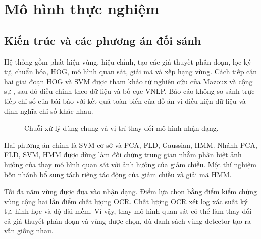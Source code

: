 \chapter{Mô hình thực nghiệm}
\section{Kiến trúc và các phương án đối sánh}
Hệ thống gồm phát hiện vùng, hiệu chỉnh, tạo các giả thuyết phân đoạn, lọc ký tự, chuẩn hóa, HOG, mô hình quan sát, giải mã và xếp hạng vùng. Cách tiếp cận hai giai đoạn HOG và SVM được tham khảo từ nghiên cứu của Mazouz và cộng sự \cite{twostage}, sau đó điều chỉnh theo dữ liệu và bố cục VNLP. Báo cáo không so sánh trực tiếp chỉ số của bài báo với kết quả toàn biển của đồ án vì điều kiện dữ liệu và định nghĩa chỉ số khác nhau.

\begin{figure}[H]\centering
{}
\caption{Chuỗi xử lý dùng chung và vị trí thay đổi mô hình nhận dạng.}
\end{figure}

Hai phương án chính là SVM cơ sở và PCA, FLD, Gaussian, HMM. Nhánh PCA, FLD, SVM, HMM được dùng làm đối chứng trung gian nhằm phân biệt ảnh hưởng của thay mô hình quan sát với ảnh hưởng của giảm chiều. Một thí nghiệm bốn nhánh bổ sung tách riêng tác động của giảm chiều và giải mã HMM.

Tối đa năm vùng được đưa vào nhận dạng. Điểm lựa chọn bằng điểm kiểm chứng vùng cộng hai lần điểm chất lượng OCR. Chất lượng OCR xét log xác suất ký tự, hình học và độ dài mềm. Vì vậy, thay mô hình quan sát có thể làm thay đổi cả giả thuyết phân đoạn và vùng được chọn, dù danh sách vùng detector tạo ra vẫn giống nhau.

